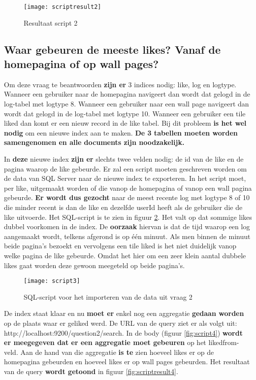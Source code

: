 \begin{figure}
	\centering
	\texttt{[image: scriptresult2]}
	\caption{Resultaat script 2}
	\label{fig:scriptresult2}
\end{figure}

\subsection{Waar gebeuren de meeste likes? Vanaf de homepagina of op wall pages?}
Om deze vraag te beantwoorden \textbf{zijn er} 3 indices nodig: like, log en logtype. Wanneer een gebruiker naar de homepagina navigeert dan wordt dat gelogd in de log-tabel met logtype 8. Wanneer een gebruiker naar een wall page navigeert dan wordt dat gelogd in de log-tabel met logtype 10. Wanneer een gebruiker een tile liked dan komt er een nieuw record in de like tabel. Bij dit probleem \textbf{is het wel nodig} om een nieuwe index aan te maken. \textbf{De 3 tabellen moeten worden samengenomen en alle documents zijn noodzakelijk.} 

In \textbf{deze} nieuwe index \textbf{zijn er} slechts twee velden nodig: de id van de like en de pagina waarop de like gebeurde. Er zal een script moeten geschreven worden om de data van SQL Server naar de nieuwe index te exporteren. In het script moet, per like, uitgemaakt worden of die vanop de homepagina of vanop een wall pagina gebeurde. \textbf{Er wordt dus gezocht} naar de meest recente log met logtype 8 of 10 die minder recent is dan de like en dezelfde userId heeft als de gebruiker die de like uitvoerde. Het SQL-script is te zien in figuur \ref{fig:script3}. Het valt op dat sommige likes dubbel voorkomen in de index. De \textbf{oorzaak} hiervan is dat de tijd waarop een log aangemaakt wordt, telkens afgerond is op één minuut. Als men binnen de minuut beide pagina's bezoekt en vervolgens een tile liked is het niet duidelijk vanop welke pagina de like gebeurde. Omdat het hier om een zeer klein aantal dubbele likes gaat worden deze gewoon meegeteld op beide pagina's.

\begin{figure}
	\centering
	\texttt{[image: script3]}
	\caption{SQL-script voor het importeren van de data uit vraag 2}
	\label{fig:script3}
\end{figure}

De index staat klaar en nu \textbf{moet er} enkel nog een aggregatie \textbf{gedaan worden} op de plaats waar er geliked werd. De URL van de query ziet er als volgt uit: http://localhost:9200/question2/\textunderscore search. In de body (figuur \ref{fig:script4}) \textbf{wordt er meegegeven dat er een aggregatie moet gebeuren} op het liked\textunderscore from-veld. Aan de hand van die aggregatie \textbf{is te} zien hoeveel likes er op de homepagina gebeurden en hoeveel likes er op wall pages gebeurden. Het resultaat van de query \textbf{wordt getoond} in figuur \ref{fig:scriptresult4}.

